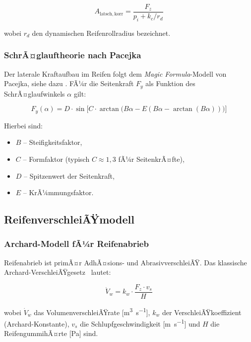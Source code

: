 ﻿\documentclass[12pt,a4paper]{article}
\theoremstyle{definition}
\theoremstyle{remark}
\newcommand{\Fz}{F_z}
\begin{document}
\begin{equation}
  A_{\mathrm{latsch,korr}} = \frac{\Fz}{p_i + k_c / r_d}
  \label{eq:latsch_korr}
\end{equation}

wobei $r_d$ den dynamischen Reifenrollradius bezeichnet.

\subsubsection{SchrÃ¤glauftheorie nach Pacejka}

Der laterale Kraftaufbau im Reifen folgt dem \emph{Magic Formula}-Modell
von Pacejka, siehe dazu \cite{Pacejka2012}. FÃ¼r die Seitenkraft $F_y$ als Funktion des
SchrÃ¤glaufwinkels $\alpha$ gilt:

\begin{equation}
  F_y(\alpha) = D \cdot \sin\!\bigl[C \cdot \arctan\!\bigl(B\alpha - E(B\alpha
    - \arctan(B\alpha))\bigr)\bigr]
  \label{eq:magic_formula}
\end{equation}

Hierbei sind:
\begin{itemize}[nosep]
  \item $B$ -- Steifigkeitsfaktor,
  \item $C$ -- Formfaktor (typisch $C \approx 1{,}3$ fÃ¼r SeitenkrÃ¤fte),
  \item $D$ -- Spitzenwert der Seitenkraft,
  \item $E$ -- KrÃ¼mmungsfaktor.
\end{itemize}

\subsection{ReifenverschleiÃŸmodell}

\subsubsection{Archard-Modell fÃ¼r Reifenabrieb}

Reifenabrieb ist primÃ¤r AdhÃ¤sions- und AbrasivverschleiÃŸ. Das klassische
Archard-VerschleiÃŸ\-gesetz~\cite{Archard1953} lautet:

\begin{equation}
  \dot{V}_w = k_w \cdot \frac{\Fz \cdot v_s}{H}
  \label{eq:archard}
\end{equation}

wobei $\dot{V}_w$ das VolumenverschleiÃŸrate [\si{\metre\cubed\per\second}],
$k_w$ der VerschleiÃŸkoeffizient (Archard-Konstante), $v_s$ die
Schlupfgeschwindigkeit [\si{\metre\per\second}] und $H$ die
ReifengummihÃ¤rte [\si{\pascal}] sind.
\end{document}
